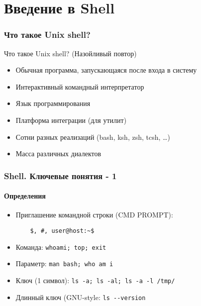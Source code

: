 





\firstframe

\section{Введение в Shell}

\begin{frame}
  \frametitle{Что такое Unix shell?}
  
  \alert{Что такое Unix shell? (Назойливый повтор)}

  \begin{itemize}
    \item Обычная программа, запускающаяся после входа в систему
    \item Интерактивный командный интерпретатор
    \item Язык программирования
    \item Платформа интеграции (для утилит)
    \item Сотни разных реализаций (bash, ksh, zsh, tcsh, \ldots )
    \item Масса различных диалектов
  \end{itemize}

\end{frame}

\begin{frame}[fragile]
  \frametitle{Shell. Ключевые понятия - 1}
  \framesubtitle{Определения}

  \begin{itemize}
    \item \alert{Приглашение командной строки (CMD PROMPT)}: \pause 
      \begin{verbatim}
	$, #, user@host:~$
      \end{verbatim} \pause
    \item \alert{Команда}: \newline \verb+whoami; top; exit+ \pause
    \item \alert{Параметр}: \newline \verb+man bash; who am i+ \pause
    \item \alert{Ключ (1 символ)}: \newline \verb+ls -a; ls -al; ls -a -l /tmp/+ \pause
    \item \alert{Длинный ключ (GNU-style}: \newline \verb+ls --version+
  \end{itemize}
\end{frame}

